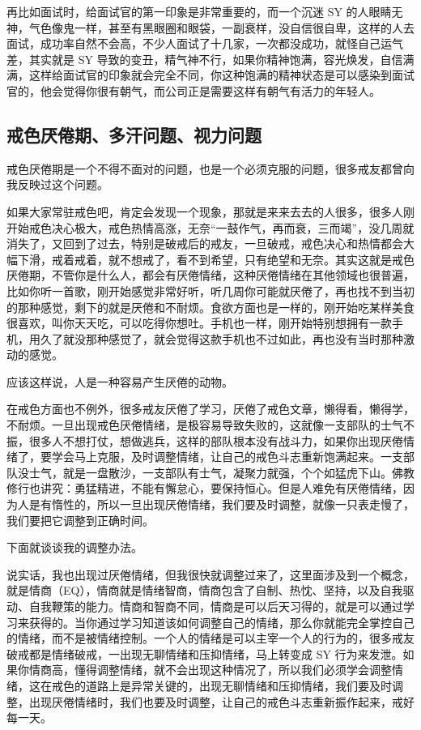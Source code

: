 \documentclass[fontset=founder]{ctexart}
\begin{document}
再比如面试时，给面试官的第一印象是非常重要的，而一个沉迷 SY 的人眼睛无神，气色像鬼一样，甚至有黑眼圈和眼袋，一副衰样，没自信很自卑，这样的人去面试，成功率自然不会高，不少人面试了十几家，一次都没成功，就怪自己运气差，其实就是 SY 导致的变丑，精气神不行，如果你精神饱满，容光焕发，自信满满，这样给面试官的印象就会完全不同，你这种饱满的精神状态是可以感染到面试官的，他会觉得你很有朝气，而公司正是需要这样有朝气有活力的年轻人。

\subsection{戒色厌倦期、多汗问题、视力问题}

戒色厌倦期是一个不得不面对的问题，也是一个必须克服的问题，很多戒友都曾向我反映过这个问题。

如果大家常驻戒色吧，肯定会发现一个现象，那就是来来去去的人很多，很多人刚开始戒色决心极大，戒色热情高涨，无奈“一鼓作气，再而衰，三而竭”，没几周就消失了，又回到了过去，特别是破戒后的戒友，一旦破戒，戒色决心和热情都会大幅下滑，戒着戒着，就不想戒了，看不到希望，只有绝望和无奈。其实这就是戒色厌倦期，不管你是什么人，都会有厌倦情绪，这种厌倦情绪在其他领域也很普遍，比如你听一首歌，刚开始感觉非常好听，听几周你可能就厌倦了，再也找不到当初的那种感觉，剩下的就是厌倦和不耐烦。食欲方面也是一样的，刚开始吃某样美食很喜欢，叫你天天吃，可以吃得你想吐。手机也一样，刚开始特别想拥有一款手机，用久了就没那种感觉了，就会觉得这款手机也不过如此，再也没有当时那种激动的感觉。

应该这样说，人是一种容易产生厌倦的动物。

在戒色方面也不例外，很多戒友厌倦了学习，厌倦了戒色文章，懒得看，懒得学，不耐烦。一旦出现戒色厌倦情绪，是极容易导致失败的，这就像一支部队的士气不振，很多人不想打仗，想做逃兵，这样的部队根本没有战斗力，如果你出现厌倦情绪了，要学会马上克服，及时调整情绪，让自己的戒色斗志重新饱满起来。一支部队没士气，就是一盘散沙，一支部队有士气，凝聚力就强，个个如猛虎下山。佛教修行也讲究：勇猛精进，不能有懈怠心，要保持恒心。但是人难免有厌倦情绪，因为人是有惰性的，所以一旦出现厌倦情绪，我们要及时调整，就像一只表走慢了，我们要把它调整到正确时间。

下面就谈谈我的调整办法。

说实话，我也出现过厌倦情绪，但我很快就调整过来了，这里面涉及到一个概念，就是情商（EQ），情商就是情绪智商，情商包含了自制、热忱、坚持，以及自我驱动、自我鞭策的能力。情商和智商不同，情商是可以后天习得的，就是可以通过学习来获得的。当你通过学习知道该如何调整自己的情绪，那么你就能完全掌控自己的情绪，而不是被情绪控制。一个人的情绪是可以主宰一个人的行为的，很多戒友破戒都是情绪破戒，一出现无聊情绪和压抑情绪，马上转变成 SY 行为来发泄。如果你情商高，懂得调整情绪，就不会出现这种情况了，所以我们必须学会调整情绪，这在戒色的道路上是异常关键的，出现无聊情绪和压抑情绪，我们要及时调整，出现厌倦情绪时，我们也要及时调整，让自己的戒色斗志重新振作起来，戒好每一天。
\end{document}
